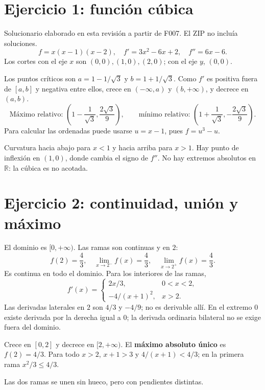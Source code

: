 \documentclass[11pt]{article}
\begin{document}
\section*{Ejercicio 1: función cúbica}
Solucionario elaborado en esta revisión a partir de F007. El ZIP no incluía soluciones.
\[f=x(x-1)(x-2),\quad f'=3x^2-6x+2,\quad f''=6x-6.\]
Los cortes con el eje $x$ son $(0,0),(1,0),(2,0)$; con el eje $y$, $(0,0)$.

Los puntos críticos son $a=1-1/\sqrt3$ y $b=1+1/\sqrt3$. Como $f'$ es positiva fuera de $[a,b]$ y negativa entre ellos, crece en $(-\infty,a)$ y $(b,+\infty)$, y decrece en $(a,b)$.
\[
\text{Máximo relativo: }\left(1-\frac1{\sqrt3},\frac{2\sqrt3}{9}\right),\qquad
\text{mínimo relativo: }\left(1+\frac1{\sqrt3},-\frac{2\sqrt3}{9}\right).
\]
Para calcular las ordenadas puede usarse $u=x-1$, pues $f=u^3-u$.

Curvatura hacia abajo para $x<1$ y hacia arriba para $x>1$. Hay punto de inflexión en $(1,0)$, donde cambia el signo de $f''$. No hay extremos absolutos en $\mathbb R$: la cúbica es no acotada.
\begin{center}\end{center}
\clearpage
\section*{Ejercicio 2: continuidad, unión y máximo}
El dominio es $[0,+\infty)$. Las ramas son continuas y en $2$:
\[f(2)=\frac43,\quad\lim_{x\to2^-}f(x)=\frac43,\quad\lim_{x\to2^+}f(x)=\frac43.\]
Es continua en todo el dominio. Para los interiores de las ramas,
\[f'(x)=\begin{cases}2x/3,&0<x<2,\\-4/(x+1)^2,&x>2.\end{cases}\]
Las derivadas laterales en $2$ son $4/3$ y $-4/9$; no es derivable allí. En el extremo $0$ existe derivada por la derecha igual a 0; la derivada ordinaria bilateral no se exige fuera del dominio.

Crece en $[0,2]$ y decrece en $[2,+\infty)$. El \textbf{máximo absoluto único} es $f(2)=4/3$. Para todo $x>2$, $x+1>3$ y $4/(x+1)<4/3$; en la primera rama $x^2/3\leq4/3$.
\begin{center}\end{center}
Las dos ramas se unen sin hueco, pero con pendientes distintas.
\clearpage
\end{document}
